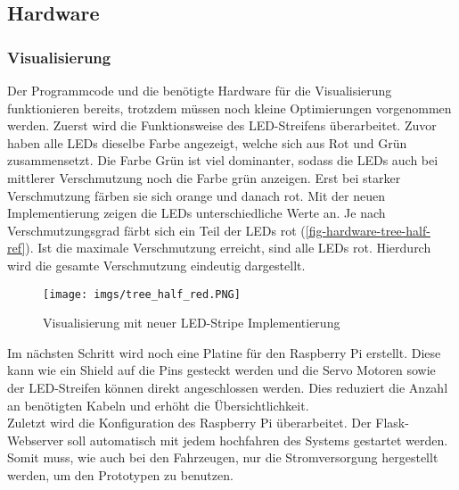 \documentclass[.../Dokumentation.tex]{subfiles}
\begin{document}
    \subsection{Hardware}\label{sec-ita4-hardware}
        \subsubsection*{Visualisierung}
    Der Programmcode und die benötigte Hardware für die Visualisierung funktionieren bereits, trotzdem müssen noch kleine Optimierungen vorgenommen werden. Zuerst wird die Funktionsweise des LED-Streifens überarbeitet. Zuvor haben alle LEDs dieselbe Farbe angezeigt, welche sich aus Rot und Grün zusammensetzt. Die Farbe Grün ist viel dominanter, sodass die LEDs auch bei mittlerer Verschmutzung noch die Farbe grün anzeigen. Erst bei starker Verschmutzung färben sie sich orange und danach rot. Mit der neuen Implementierung zeigen die LEDs unterschiedliche Werte an. Je nach Verschmutzungsgrad färbt sich ein Teil der LEDs rot (\autoref{fig-hardware-tree-half-ref}). Ist die maximale Verschmutzung erreicht, sind alle LEDs rot. Hierdurch wird die gesamte Verschmutzung eindeutig dargestellt.
    \begin{figure}[H]
    	\begin{center}
    		\texttt{[image: imgs/tree\_half\_red.PNG]}
    		\caption{Visualisierung mit neuer LED-Stripe Implementierung}
    		\label{fig-hardware-tree-half-ref}
    	\end{center}
    \end{figure}
	\noindent
    Im nächsten Schritt wird noch eine Platine für den Raspberry Pi erstellt. Diese kann wie ein Shield auf die Pins gesteckt werden und die Servo Motoren sowie der LED-Streifen können direkt angeschlossen werden. Dies reduziert die Anzahl an benötigten Kabeln und erhöht die Übersichtlichkeit.\\
    Zuletzt wird die Konfiguration des Raspberry Pi überarbeitet. Der Flask-Webserver soll automatisch mit jedem hochfahren des Systems gestartet werden. Somit muss, wie auch bei den Fahrzeugen, nur die Stromversorgung hergestellt werden, um den Prototypen zu benutzen.
        
\end{document}
